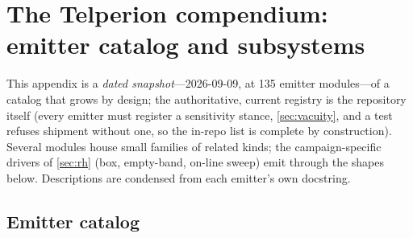 \section{The Telperion compendium: emitter catalog and subsystems}
\label{sec:compendium}

This appendix is a \emph{dated snapshot}---2026-09-09, at 135 emitter
modules---of a catalog that grows by design; the authoritative, current
registry is the repository itself (every emitter must register a sensitivity
stance, \cref{sec:vacuity}, and a test refuses shipment without one, so the
in-repo list is complete by construction). Several modules house small families
of related kinds; the campaign-specific drivers of \cref{sec:rh} (box,
empty-band, on-line sweep) emit through the shapes below. Descriptions are
condensed from each emitter's own docstring.

\subsection{Emitter catalog}

